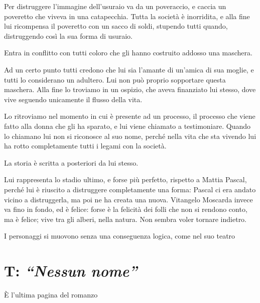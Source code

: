 \documentclass[a4paper, twoside, titlepage]{book}
\begin{document}
Per distruggere l’immagine dell’usuraio va da un poveraccio, e caccia un poveretto che viveva in una catapecchia. Tutta la società è inorridita, e alla fine lui ricompensa il poveretto con un sacco di soldi, stupendo tutti quando, distruggendo così la sua forma di usuraio.

Entra in conflitto con tutti coloro che gli hanno costruito addosso una maschera.

Ad un certo punto tutti credono che lui sia l’amante di un’amica di sua moglie, e tutti lo considerano un adultero. Lui non può proprio sopportare questa maschera.
Alla fine lo troviamo in un ospizio, che aveva finanziato lui stesso, dove vive seguendo unicamente il flusso della vita.

Lo ritroviamo nel momento in cui è presente ad un processo, il processo che viene fatto alla donna che gli ha sparato, e lui viene chiamato a testimoniare.
Quando lo chiamano lui non si riconosce al suo nome, perché nella vita che sta vivendo lui ha rotto completamente tutti i legami con la società.

La storia è scritta a posteriori da lui stesso.

Lui rappresenta lo stadio ultimo, e forse più perfetto, rispetto a Mattia Pascal, perché lui è riuscito a distruggere completamente una forma: Pascal ci era andato vicino a distruggerla, ma poi ne ha creata una nuova.
Vitangelo Moscarda invece va fino in fondo, ed è felice: forse è la felicità dei folli che non si rendono conto, ma è felice; vive tra gli alberi, nella natura.
Non sembra voler tornare indietro.

I personaggi si muovono senza una conseguenza logica, come nel suo teatro

\section{T: \textit{“Nessun nome”}}

È l’ultima pagina del romanzo
\end{document}
